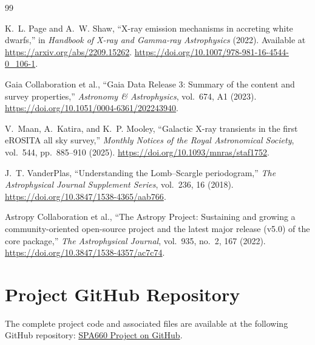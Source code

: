 \documentclass[12pt,a4paper]{article}
\begin{document}
\begin{thebibliography}{99}

K.~L. Page and A.~W. Shaw,
``X-ray emission mechanisms in accreting white dwarfs,''
in \emph{Handbook of X-ray and Gamma-ray Astrophysics} (2022).
Available at \url{https://arxiv.org/abs/2209.15262}.
\url{https://doi.org/10.1007/978-981-16-4544-0_106-1}.

Gaia Collaboration et al.,
``Gaia Data Release 3: Summary of the content and survey properties,''
\emph{Astronomy \& Astrophysics}, vol.~674, A1 (2023).
\url{https://doi.org/10.1051/0004-6361/202243940}.

V.~Maan, A.~Katira, and K.~P. Mooley,
``Galactic X-ray transients in the first eROSITA all sky survey,''
\emph{Monthly Notices of the Royal Astronomical Society},
vol.~544, pp.~885--910 (2025).
\url{https://doi.org/10.1093/mnras/staf1752}.

J.~T. VanderPlas,
``Understanding the Lomb--Scargle periodogram,''
\emph{The Astrophysical Journal Supplement Series}, vol.~236, 16 (2018).
\url{https://doi.org/10.3847/1538-4365/aab766}.

Astropy Collaboration et al.,
``The Astropy Project: Sustaining and growing a community-oriented open-source project and the latest major release (v5.0) of the core package,''
\emph{The Astrophysical Journal}, vol.~935, no.~2, 167 (2022).
\url{https://doi.org/10.3847/1538-4357/ac7c74}.

\end{thebibliography}

\section*{Project GitHub Repository}
The complete project code and associated files are available at the following GitHub repository: \href{https://github.com/nishanthgone/SPA660_Project}{SPA660 Project on GitHub}.
\end{document}
